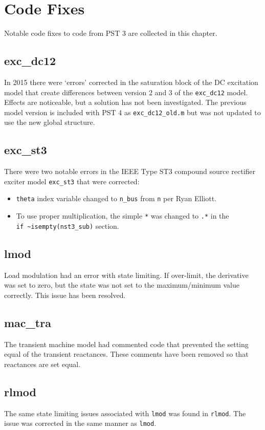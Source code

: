 \chapter{Code Fixes}
Notable code fixes to code from PST 3 are collected in this chapter.

\section{exc\_dc12}  
In 2015 there were `errors' corrected in the saturation block  of the DC excitation model that create differences between version 2 and 3 of the \verb|exc_dc12| model.
Effects are noticeable, but a solution has not been investigated.
The previous model version is included with PST 4 as \verb|exc_dc12_old.m| but was not updated to use the new global structure.

\section{exc\_st3}  
There were two notable errors in the IEEE Type ST3 compound source rectifier exciter model \verb|exc_st3| that were corrected:
\begin{itemize}
\singlespacing
{} em
\item \verb|theta| index variable changed to \verb|n_bus| from \verb|n| per Ryan Elliott.
\item To use proper multiplication, the simple \verb|*| was changed to \verb|.*| in the \\ \verb|if ~isempty(nst3_sub)| section.
\end{itemize}

\section{lmod}  
Load modulation had an error with state limiting.
If over-limit, the derivative was set to zero, but the state was not set to the maximum/minimum value correctly.
This issue has been resolved.
 
\section{mac\_tra}  
The transient machine model had commented code that prevented the setting equal of the transient reactances.
These comments have been removed so that reactances are set equal.

\section{rlmod}  
The same state limiting issues associated with \verb|lmod| was found in \verb|rlmod|.
The issue was corrected in the same manner as \verb|lmod|.